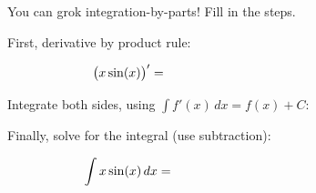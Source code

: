 You can grok integration-by-parts!  Fill in the steps.

\medskip
\noindent First, derivative by product rule:

$$\big(x \sin(x)\big)' = \hspace{60mm}$$

\vspace{5mm}

\noindent Integrate both sides, using $\int f'(x)\,dx = f(x) + C$:

\vspace{25mm}

\noindent Finally, solve for the integral (use subtraction):

$$\int x \sin(x)\,dx = \hspace{60mm}$$
